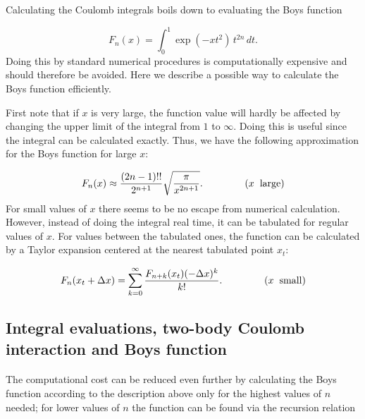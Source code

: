 \documentclass[%
twoside,                 %
final,                   %
10pt]{article}
\begin{document}
Calculating the Coulomb integrals boils down to evaluating the Boys function

\begin{equation}
 F_n(x) = \int_0^1\exp(-xt^2)\,t^{2n}\,dt.
\end{equation}
Doing this by standard numerical procedures is computationally
expensive and should therefore be avoided. Here we describe a possible way to calculate the Boys function efficiently.

First note that if $x$ is very large, the function value will hardly be affected by changing the upper limit of the integral from $1$ to $\infty$. Doing this is useful
since the integral can be calculated exactly. Thus, we have the following approximation for the Boys function for large $x$:

\begin{equation}
 F_n(x) \approx \frac{(2n-1)!!}{2^{n+1}}\sqrt{\frac{\pi}{x^{2n+1}}}. \hspace{15mm} (x\hspace{2mm}\mathrm{large})
\end{equation}
For small values of $x$ there seems to be no escape from numerical calculation. However, instead of doing the integral real time, it can be tabulated for regular values of $x$.
For values between the tabulated ones, the function can be calculated by a Taylor expansion centered at the nearest tabulated point $x_t$:

\begin{equation}
 F_n(x_t+\Delta x) = \sum_{k=0}^\infty\frac{F_{n+k}(x_t) (-\Delta x)^k}{k!}. \hspace{15mm} (x\hspace{2mm}\mathrm{small})
\end{equation}



\subsection*{Integral evaluations, two-body Coulomb interaction and Boys function}

\paragraph{}

The computational cost can be reduced even further by calculating the Boys function according to the description above only for the highest values of $n$ needed; for lower values of $n$ the function
can be found via the recursion relation
\end{document}
